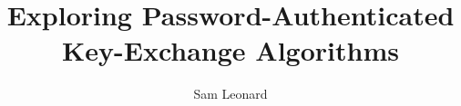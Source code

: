 \documentclass[12pt, a4paper]{third-rep}
\title{Exploring Password-Authenticated Key-Exchange Algorithms}
\author{Sam Leonard}
\begin{document}
\dotitleandabstract

\tableofcontents







\printnoidxglossaries{}


\nocite{*}


\appendix


\end{document}

